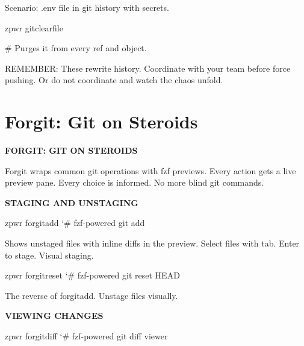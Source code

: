 \documentclass[11pt,a4paper,twoside]{book}
\begin{document}
Scenario: .env file in git history with secrets.

\begin{codebox}
\color{neongreen}zpwr gitclearfile\\
\end{codebox}

\# Purges it from every ref and object.

REMEMBER: These rewrite history. Coordinate with your team before force pushing. Or do not coordinate and watch the chaos unfold.


\vspace{16pt}

\section{Forgit: Git on Steroids}


\vspace{10pt}
{\large\bfseries\color{neoncyan} FORGIT: GIT ON STEROIDS}\vspace{6pt}

Forgit wraps common git operations with fzf previews. Every action gets a live preview pane. Every choice is informed. No more blind git commands.


\vspace{12pt}
{\bfseries\color{neonyellow} STAGING AND UNSTAGING}\vspace{4pt}

\begin{codebox}
\color{neongreen}zpwr forgitadd            {\char`\#} fzf-powered git add\\
\end{codebox}

Shows unstaged files with inline diffs in the preview. Select files with tab. Enter to stage. Visual staging.

\begin{codebox}
\color{neongreen}zpwr forgitreset          {\char`\#} fzf-powered git reset HEAD\\
\end{codebox}

The reverse of forgitadd. Unstage files visually.


\vspace{12pt}
{\bfseries\color{neonyellow} VIEWING CHANGES}\vspace{4pt}

\begin{codebox}
\color{neongreen}zpwr forgitdiff           {\char`\#} fzf-powered git diff viewer\\
\end{codebox}
\end{document}
